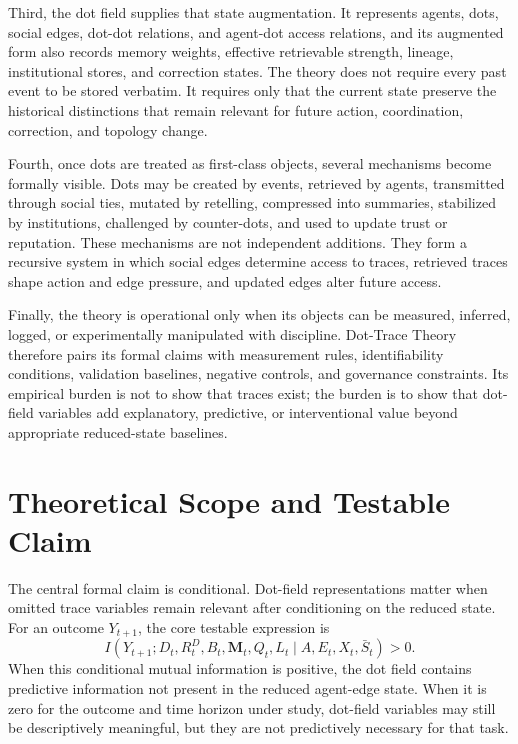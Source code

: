 \documentclass[11pt]{article}
\theoremstyle{remark}
\begin{document}
Third, the dot field supplies that state augmentation. It represents agents, dots, social edges, dot-dot relations, and agent-dot access relations, and its augmented form also records memory weights, effective retrievable strength, lineage, institutional stores, and correction states. The theory does not require every past event to be stored verbatim. It requires only that the current state preserve the historical distinctions that remain relevant for future action, coordination, correction, and topology change.

Fourth, once dots are treated as first-class objects, several mechanisms become formally visible. Dots may be created by events, retrieved by agents, transmitted through social ties, mutated by retelling, compressed into summaries, stabilized by institutions, challenged by counter-dots, and used to update trust or reputation. These mechanisms are not independent additions. They form a recursive system in which social edges determine access to traces, retrieved traces shape action and edge pressure, and updated edges alter future access.

Finally, the theory is operational only when its objects can be measured, inferred, logged, or experimentally manipulated with discipline. Dot-Trace Theory therefore pairs its formal claims with measurement rules, identifiability conditions, validation baselines, negative controls, and governance constraints. Its empirical burden is not to show that traces exist; the burden is to show that dot-field variables add explanatory, predictive, or interventional value beyond appropriate reduced-state baselines.

\section{Theoretical Scope and Testable Claim}\label{theoretical-scope-testable-claim}

The central formal claim is conditional. Dot-field representations matter when omitted trace variables remain relevant after conditioning on the reduced state. For an outcome $Y_{t+1}$, the core testable expression is
\[
I(Y_{t+1};D_t,R_t^D,B_t,\mathbf M_t,Q_t,L_t\mid A,E_t,X_t,\bar S_t)>0.
\]
When this conditional mutual information is positive, the dot field contains predictive information not present in the reduced agent-edge state. When it is zero for the outcome and time horizon under study, dot-field variables may still be descriptively meaningful, but they are not predictively necessary for that task.
\end{document}
